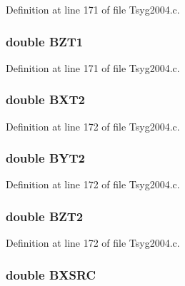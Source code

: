 Definition at line 171 of file Tsyg2004.c.\hypertarget{struct___t_s04_info_93a85c3a80b04297d6f27ec8f101a492}{
\subsubsection[{BZT1}]{\setlength{\rightskip}{0pt plus 5cm}double {\bf BZT1}}}
\label{struct___t_s04_info_93a85c3a80b04297d6f27ec8f101a492}




Definition at line 171 of file Tsyg2004.c.\hypertarget{struct___t_s04_info_da5892db5a6efc3833cea1ea6d11038b}{
\subsubsection[{BXT2}]{\setlength{\rightskip}{0pt plus 5cm}double {\bf BXT2}}}
\label{struct___t_s04_info_da5892db5a6efc3833cea1ea6d11038b}




Definition at line 172 of file Tsyg2004.c.\hypertarget{struct___t_s04_info_95a5d798af13bd1b13588f7ca9dd5469}{
\subsubsection[{BYT2}]{\setlength{\rightskip}{0pt plus 5cm}double {\bf BYT2}}}
\label{struct___t_s04_info_95a5d798af13bd1b13588f7ca9dd5469}




Definition at line 172 of file Tsyg2004.c.\hypertarget{struct___t_s04_info_d575bebb4a1cdd837964550ff8aa5eee}{
\subsubsection[{BZT2}]{\setlength{\rightskip}{0pt plus 5cm}double {\bf BZT2}}}
\label{struct___t_s04_info_d575bebb4a1cdd837964550ff8aa5eee}




Definition at line 172 of file Tsyg2004.c.\hypertarget{struct___t_s04_info_af2e403c9b140104188d1eef09cca4a6}{
\subsubsection[{BXSRC}]{\setlength{\rightskip}{0pt plus 5cm}double {\bf BXSRC}}}
\label{struct___t_s04_info_af2e403c9b140104188d1eef09cca4a6}




